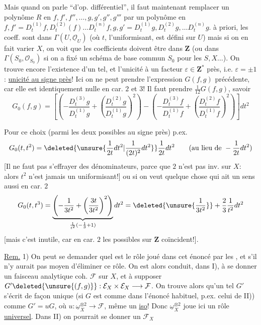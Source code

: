 Mais quand on parle ``d'op. différentiel'', il faut maintenant remplacer
un polynôme $R$ en $f,f',f'',\ldots,g,g',g'',g'''$ par un
polynôme en
$f,f'=D_t^{(1)}f,D_t^{(2)}(f)\ldots D_t^{(n)}f,
g,g'=D_t^{(1)}g,D_t^{(2)}g,\ldots D_t^{(n)}g$.
 à priori, les coeff.
sont dans $\Gamma(U,\underline{\mathcal{O}}_U)$
(où $t$, l'uniformisant, est défini sur $U$)
mais si on  en fait varier $X$, on
voit que les coefficients doivent être dans \uline{$\mathbf{Z}$}
(ou dans $\Gamma(S_0,\mathcal{O}_{S_0})$ si on a fixé un schéma de base
commun $S_0$ pour les $S,X\ldots$).
On trouve encore l'existence d'un tel, et l'unicité
à un facteur $\varepsilon\in\mathbf{Z}^{*}$ près, i.e. $\varepsilon=\pm1$:
\uline{unicité au signe près}! Ici on ne peut
prendre l'expression $G(f,g)$ précédente, car elle est
identiquement nulle en car. $2$ et $3$! Il faut
prendre $\frac1{12}G(f,g)$, savoir
\[
G_0(f,g)=\left[
\left(-\frac{D_t^{(3)}g}{D_t^{(1)}g}
+\left(\frac{D_t^{(2)}g}{D_t^{(1)}g}\right)^2\right)
-\left(-\frac{D_t^{(3)}f}{D_t^{(1)}f}
+\left(\frac{D_t^{(2)}f}{D_t^{(1)}f}\right)^2\right)
\right]dt^2
\]

Pour  ce choix (parmi les deux
possibles au signe près)  p.ex.
\[
G_0(t,t^2)=\deleted{\unsure{\frac1{2t}dt^2|\frac1{(2t)^2}dt^2}}
\frac1{2t}dt^2\qquad
(\text{au lieu de }-\frac1{2t}dt^2)
\]
[Il ne faut pas s'effrayer des dénominateurs, parce que
 $2$ n'est pas inv. sur $X$: alors $t^2$ n'est jamais
un uniformisant!] ou si on veut quelque chose
qui ait un sens aussi en car. $2$
\[
G_0(t,t^3)=
\underbrace{\left(-\frac1{3t^2}+\left(\frac{3t}{3t^2}\right)^2\right)}_
{\frac1{t^2}(-\frac13+1)}dt^2
=\deleted{\unsure{\frac1{3t^2}}}+\frac23\frac1{t^2}dt^2
\]
[mais c'est inutile, car en car. $2$ les 
 possibles sur $\mathbf{Z}$ coïncident!].

\uline{Rem.} 1) On peut se demander quel est le rôle joué dans
cet énoncé par les , et s'il n'y aurait pas
moyen d'éliminer ce rôle. On est alors conduit,
dans I), à se donner un faisceau analytique
coh. $\mathcal{F}$ sur $X$, et à supposer
$G'\deleted{\unsure{(f,g)}}:\mathcal{E}_X\times\mathcal{E}_X\longrightarrow\mathcal{F}$.
On trouve alors qu'un tel $G'$ s'écrit de façon unique
(si $G$ est comme dans l'énoncé habituel, p.ex. celui de
II)) comme $G'=uG$, où $u:\underline{\omega}_X^{\otimes2}\longrightarrow\mathcal{F}$,
 même un \uline{iso}!
Donc $\underline{\omega}_X^{\otimes2}$ joue ici un rôle \uline{universel}.
Dans II) on pourrait se donner un $\mathcal{F}_X$ 

